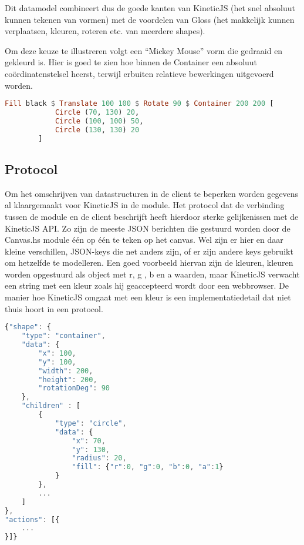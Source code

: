 Dit datamodel combineert dus de goede kanten van KineticJS (het snel absoluut kunnen tekenen van vormen) met de voordelen van Gloss (het makkelijk kunnen verplaatsen, kleuren, roteren etc. van meerdere shapes).

Om deze keuze te illustreren volgt een ``Mickey Mouse'' vorm die gedraaid en gekleurd is. Hier is goed te zien hoe binnen de Container een absoluut co\"ordinatenstelsel heerst, terwijl erbuiten relatieve bewerkingen uitgevoerd worden.

\begin{lstlisting}[style=densecode, language=Haskell]
Fill black $ Translate 100 100 $ Rotate 90 $ Container 200 200 [
            Circle (70, 130) 20,
            Circle (100, 100) 50,
            Circle (130, 130) 20
        ]
\end{lstlisting}

\subsection{Protocol}
Om het omschrijven van datastructuren in de client te beperken worden gegevens al klaargemaakt voor KineticJS in de module. Het protocol dat de verbinding tussen de module en de client beschrijft heeft hierdoor sterke gelijkenissen met de KineticJS API. Zo zijn de meeste JSON berichten die gestuurd worden door de Canvas.hs module één op één te teken op het canvas. Wel zijn er hier en daar kleine verschillen, JSON-keys die net anders zijn, of er zijn andere keys gebruikt om hetzelfde te modelleren. Een goed voorbeeld hiervan zijn de kleuren, kleuren worden opgestuurd als object met r, g , b en a waarden, maar KineticJS verwacht een string met een kleur zoals hij geaccepteerd wordt door een webbrowser. De manier hoe KineticJS omgaat met een kleur is een implementatiedetail dat niet thuis hoort in een protocol.

\begin{lstlisting}[style=densecode, language=JavaScript]
{"shape": {
    "type": "container",
    "data": {
        "x": 100,
        "y": 100,
        "width": 200,
        "height": 200,
        "rotationDeg": 90
    },
    "children" : [
        {
            "type": "circle",
            "data": {
                "x": 70,
                "y": 130,
                "radius": 20,
                "fill": {"r":0, "g":0, "b":0, "a":1}
            }
        },
        ...
    ]
},
"actions": [{
    ...
}]}
\end{lstlisting}

